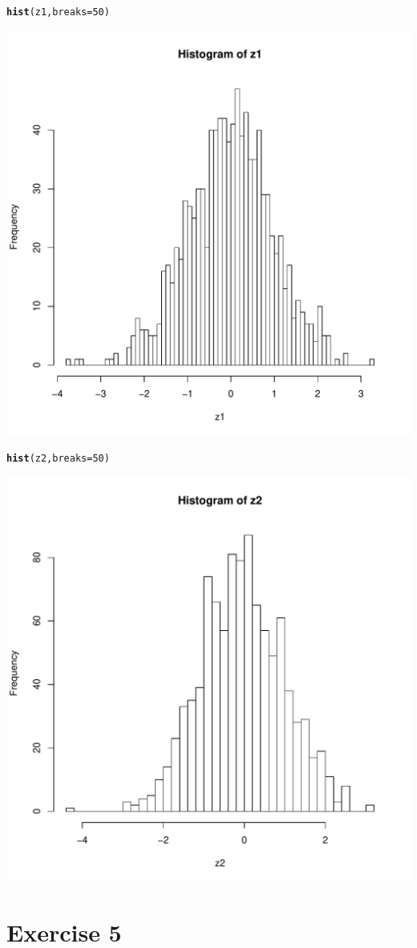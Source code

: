 \documentclass{article}\usepackage[]{graphicx}\usepackage[]{color}
\makeatletter
\newcommand{\hlnum}[1]{\textcolor[rgb]{0.686,0.059,0.569}{#1}}%
\newcommand{\hlstd}[1]{\textcolor[rgb]{0.345,0.345,0.345}{#1}}%
\newcommand{\hlkwc}[1]{\textcolor[rgb]{0.333,0.667,0.333}{#1}}%
\newcommand{\hlkwd}[1]{\textcolor[rgb]{0.737,0.353,0.396}{\textbf{#1}}}%
\newenvironment{kframe}{%
 \def\at@end@of@kframe{}%
 \ifinner\ifhmode%
  \def\at@end@of@kframe{\end{minipage}}%
  \begin{minipage}{\columnwidth}%
 \fi\fi%
 \def\FrameCommand##1{\hskip\@totalleftmargin \hskip-\fboxsep
 \colorbox{shadecolor}{##1}\hskip-\fboxsep
     \hskip-\linewidth \hskip-\@totalleftmargin \hskip\columnwidth}%
 \MakeFramed {\advance\hsize-\width
   \@totalleftmargin\z@ \linewidth\hsize
   \@setminipage}}%
 {\par\unskip\endMakeFramed%
 \at@end@of@kframe}
\newenvironment{knitrout}{}{} %
\makeatother
\begin{document}
\begin{knitrout}
\begin{kframe}\begin{alltt}
\hlkwd{hist}\hlstd{(z1,} \hlkwc{breaks} \hlstd{=} \hlnum{50}\hlstd{)}
\end{alltt}
\end{kframe}
\includegraphics[width=0.50\linewidth]{figure/unnamed-chunk-4-3} 
\begin{kframe}\begin{alltt}
\hlkwd{hist}\hlstd{(z2,} \hlkwc{breaks} \hlstd{=} \hlnum{50}\hlstd{)}
\end{alltt}
\end{kframe}
\includegraphics[width=0.50\linewidth]{figure/unnamed-chunk-4-4} 

\end{knitrout}

\section*{Exercise 5}
\end{document}

